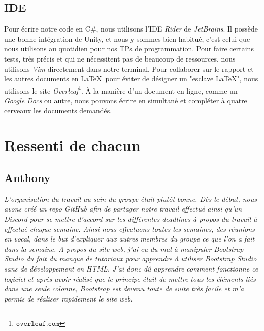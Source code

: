 \documentclass[12pt,a4paper]{article}
\begin{document}
    \subsection{IDE}
        Pour écrire notre code en C\#, nous utilisons l'IDE \textsl{Rider} de 
        \textsl{JetBrains}. Il possède une bonne intégration de Unity, et nous
        y sommes bien habitué, c'est celui que nous utilisons au quotidien pour
        nos TPs de programmation. Pour faire certains tests, très précis et qui
        ne nécessitent pas de beaucoup de ressources, nous utilisons \textsl{Vim}
        directement dans notre terminal.
        Pour collaborer sur le rapport et les autres documents en \LaTeX\, 
        pour éviter de désigner un "esclave \LaTeX", nous utilisons le site 
        \textsl{Overleaf}\footnote{\(\mathtt{overleaf.com}\)}. 
        À la manière d'un document en ligne, comme 
        un \textsl{Google Docs} ou autre, nous pouvons écrire en
        simultané et compléter à quatre cerveaux les documents demandés.

\clearpage

\section{Ressenti de chacun}
    \subsection{Anthony}
        \textit{L’organisation du travail au sein du groupe était plutôt bonne.
        Dès le début, nous avons créé un repo \textsl{GitHub} afin de partager notre travail 
        effectué ainsi qu’un \textsl{Discord} pour se mettre d’accord sur les différentes 
        deadlines à propos du travail à effectué chaque semaine. Ainsi nous 
        effectuons toutes les semaines, des réunions en vocal, dans le but 
        d’expliquer aux autres membres du groupe ce que l’on a fait dans la 
        semaine. A propos du site web, j’ai eu du mal à manipuler \textsl{Bootstrap Studio} 
        du fait du manque de tutoriaux pour apprendre à utiliser \textsl{Bootstrap Studio}
        sans de développement en HTML. J’ai donc dû apprendre comment fonctionne 
        ce logiciel et après avoir réalisé que le principe était de mettre tous 
        les éléments liés dans une seule colonne, \textsl{Bootstrap} est devenu toute de 
        suite très facile et m’a permis de réaliser rapidement le site web.}
  
\end{document}
